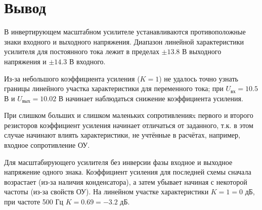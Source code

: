 \section{Вывод}
В инвертирующем масштабном усилителе устанавливаются противоположные знаки входного и выходного напряжения. Диапазон линейной характеристики усилителя для постоянного тока лежит в пределах $\pm 13.8$ В выходного напряжения и $\pm 14.3$ В входного.

Из-за небольшого коэффициента усиления ($K=1$) не удалось точно узнать границы линейного участка характеристики для переменного тока; при $U_{вх}=10.5$ В и $U_{вых}=10.02$ В начинает наблюдаться снижение коэффициента усиления.

При слишком больших и слишком маленьких сопротивленияx первого и второго резисторов коэффициент усиления начинает отличаться от заданного, т.к. в этом случае начинают влиять характеристики, не учтённые в расчётах, например, входное сопротивление ОУ.

Для масштабирующего усилителя без инверсии фазы входное и выходное напряжение одного знака.
Коэффициент усиления для последней схемы сначала возрастает (из-за наличия конденсатора), а затем убывает начиная с некоторой частоты (из-за свойств ОУ). На линейном участке характеристики $K=1=0$ дБ, при частоте 500 Гц $K=0.69=-3.2$ дБ.
